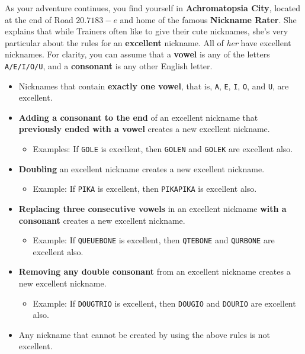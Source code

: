 

As your adventure continues, you find yourself in
\textbf{Achromatopsia City}, located at the end of Road \(20.7183-e\)
and home of the famous \mappMobidash{} \textbf{Nickname Rater}.
She explains that while Trainers often like to give their
\mappMobidot{} cute nicknames, she's very particular about the rules
for an \textbf{excellent} nickname. All of \textit{her} \mappMobidash{} have
excellent nicknames. For clarity, you can assume
that a \textbf{vowel} is any of the letters \texttt{A/E/I/O/U}, and a
\textbf{consonant} is any other English letter.

\begin{itemize}
  \item Nicknames that contain \textbf{exactly one vowel}, that is,
        \texttt{A}, \texttt{E}, \texttt{I}, \texttt{O}, and
        \texttt{U}, are excellent.
  \item \textbf{Adding a consonant to the end} of an excellent nickname
        that \textbf{previously ended with a vowel}
        creates a new excellent nickname.
    \begin{itemize}
      \item Examples: If \texttt{GOLE} is excellent, then
            \texttt{GOLEN} and \texttt{GOLEK} are excellent also.
    \end{itemize}
  \item \textbf{Doubling} an excellent nickname creates a new excellent
        nickname.
    \begin{itemize}
      \item Example: If \texttt{PIKA} is excellent, then
            \texttt{PIKAPIKA} is excellent also.
    \end{itemize}
  \item \textbf{Replacing three consecutive vowels} in
        an excellent nickname \textbf{with a consonant}
        creates a new excellent nickname.
    \begin{itemize}
      \item Example: If \texttt{QUEUEBONE} is excellent, then
        \texttt{QTEBONE} and \texttt{QURBONE} are excellent also.
    \end{itemize}
  \item \textbf{Removing any double consonant} from an excellent nickname
        creates a new excellent nickname.
    \begin{itemize}
      \item Example: If \texttt{DOUGTRIO} is excellent, then
        \texttt{DOUGIO} and \texttt{DOURIO} are excellent also.
    \end{itemize}
  \item Any nickname that cannot be created by using the above rules
        is not excellent.
\end{itemize}


